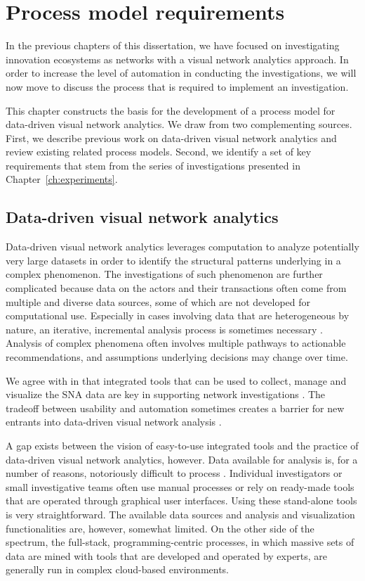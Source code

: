 \chapter{Process model requirements}
\label{ch:processmodels}

In the previous chapters of this dissertation, we have focused on investigating innovation ecosystems as networks with a visual network analytics approach. In order to increase the level of automation in conducting the investigations, we will now move to discuss the process that is required to implement an investigation.

This chapter constructs the basis for the development of a process model for data-driven visual network analytics. We draw from two complementing sources. First, we describe previous work on data-driven visual network analytics and review existing related process models. Second, we identify a set of key requirements that stem from the series of investigations presented in Chapter~\ref{ch:experiments}.

\section{Data-driven visual network analytics}

Data-driven visual network analytics leverages computation to analyze potentially very large datasets in order to identify the structural patterns underlying in a complex phenomenon. The investigations of such phenomenon are further complicated because data on the actors and their transactions often come from multiple and diverse data sources, some of which are not developed for computational use. Especially in cases involving data that are heterogeneous by nature, an iterative, incremental analysis process is sometimes necessary \citep{Telea2008}. Analysis of complex phenomena often involves multiple pathways to actionable recommendations, and assumptions underlying decisions may change over time.

We agree with \cite{Freeman2000VisualizingNetworks} in that integrated tools that can be used to collect, manage and visualize the SNA data are key in supporting network investigations \cite[cf.][]{Huhtamaki2010Context-DrivenCo-Creation}. The tradeoff between usability and automation sometimes creates a barrier for new entrants into data-driven visual network analysis \citep{Hansen2012DoData}.

A gap exists between the vision of easy-to-use integrated tools and the practice of data-driven visual network analytics, however. Data available for analysis is, for a number of reasons, notoriously difficult to process \citep{Salonen2013ChallengesMedia}. Individual investigators or  small investigative teams often use manual processes or rely on ready-made tools that are operated through graphical user interfaces. Using these stand-alone tools is very straightforward. The available data sources and analysis and visualization functionalities are, however, somewhat limited. On the other side of the spectrum, the full-stack, programming-centric processes, in which massive sets of data are mined with tools that are developed and operated by experts, are generally run in complex cloud-based environments.

